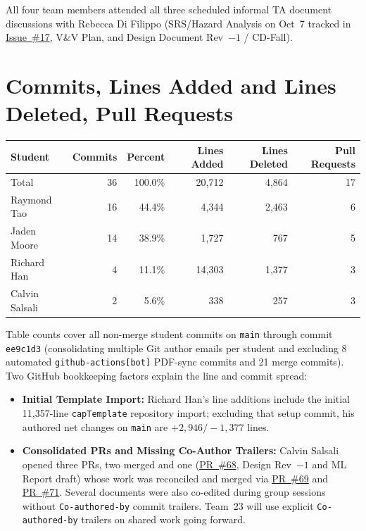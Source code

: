 \documentclass{article}
\begin{document}
All four team members attended all three scheduled informal TA document discussions with Rebecca Di Filippo (SRS/Hazard Analysis on Oct~7 tracked in \href{https://github.com/richy1337/Verity/issues/17}{Issue~\#17}, V\&V Plan, and Design Document Rev~$-1$ / CD-Fall).

\section{Commits, Lines Added and Lines Deleted, Pull Requests}

\begin{table}[H]
\centering
\begin{tabular}{lrrrrr}
\toprule
\textbf{Student} & \textbf{Commits} & \textbf{Percent} & \textbf{Lines Added} &
\textbf{Lines Deleted} & \textbf{Pull Requests}\\
\midrule
Total & 36 & 100.0\% & 20,712 & 4,864 & 17\\
Raymond Tao & 16 & 44.4\% & 4,344 & 2,463 & 6\\
Jaden Moore & 14 & 38.9\% & 1,727 & 767 & 5\\
Richard Han & 4 & 11.1\% & 14,303 & 1,377 & 3\\
Calvin Salsali & 2 & 5.6\% & 338 & 257 & 3\\
\bottomrule
\end{tabular}
\end{table}

Table counts cover all non-merge student commits on \texttt{main} through commit \texttt{ee9c1d3} (consolidating multiple Git author emails per student and excluding 8 automated \texttt{github-actions[bot]} PDF-sync commits and 21 merge commits). Two GitHub bookkeeping factors explain the line and commit spread:
\begin{itemize}
    \item \textbf{Initial Template Import:} Richard Han's line additions include the initial 11,357-line \texttt{capTemplate} repository import; excluding that setup commit, his authored net changes on \texttt{main} are $+2,946 / -1,377$ lines.
    \item \textbf{Consolidated PRs and Missing Co-Author Trailers:} Calvin Salsali opened three PRs, two merged and one (\href{https://github.com/richy1337/Verity/pull/68}{PR~\#68}, Design Rev~$-1$ and ML Report draft) whose work was reconciled and merged via \href{https://github.com/richy1337/Verity/pull/69}{PR~\#69} and \href{https://github.com/richy1337/Verity/pull/71}{PR~\#71}. Several documents were also co-edited during group sessions without \texttt{Co-authored-by} commit trailers. Team~23 will use explicit \texttt{Co-authored-by} trailers on shared work going forward.
\end{itemize}
\end{document}
